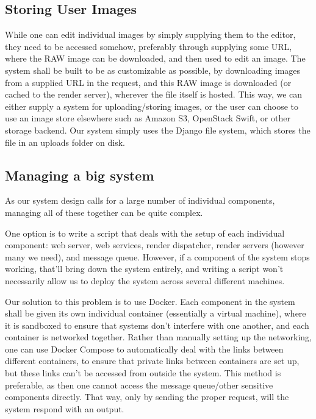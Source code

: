 \documentclass[10pt,a4paper]{article}
\begin{document}
\subsection{Storing User Images}
While one can edit individual images by simply supplying them to the editor, they need to be accessed somehow,
preferably through supplying some URL, where the RAW image can be downloaded, and then used to edit an image.
The system shall be built to be as customizable as possible, by downloading images from a supplied URL in the request,
and this RAW image is downloaded (or cached to the render server), wherever the file itself is hosted. This way, we can
either supply a system for uploading/storing images, or the user can choose to use an image store elsewhere such as Amazon
S3, OpenStack Swift, or other storage backend. Our system simply uses the Django file system, which stores the file in an
uploads folder on disk.



\subsection{Managing a big system}
As our system design calls for a large number of individual components, managing all of these together can be quite complex.

One option is to write a script that deals with the setup of each individual component: web server, web services, render dispatcher, render servers (however many we need),
and message queue. However, if a component of the system stops working, that'll bring down the system entirely, and writing a script won't necessarily allow us to deploy the system
across several different machines.

Our solution to this problem is to use Docker. Each component in the system shall be given its own individual container (essentially a virtual machine), where
it is sandboxed to ensure that systems don't interfere with one another, and each container is networked together. Rather than manually setting up the networking,
one can use Docker Compose to automatically deal with the links between different containers, to ensure that private links between containers are set up, but these links
can't be accessed from outside the system. This method is preferable, as then one cannot access the message queue/other sensitive components directly. That way, only by sending
the proper request, will the system respond with an output.
\end{document}
